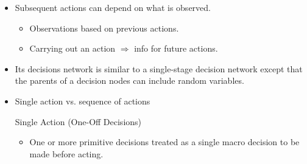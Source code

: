 \documentclass{article}
\begin{document}
\begin{itemize}
    \item Subsequent actions can depend on what is observed.
        \begin{itemize}
            \item Observations based on previous actions.
            \item Carrying out an action $\Rightarrow$ info for future actions.
        \end{itemize}
    \item Its decisions network is similar to a single-stage decision network except that the parents of a decision nodes can include random variables.
    \item Single action vs. sequence of actions
     \begin{multicols}{2}
            Single Action (One-Off Decisions)
            \begin{itemize}
                \item One or more primitive decisions treated as a single macro decision to be made before acting.
            \end{itemize}
            
            \columnbreak
            

\end{multicols}
\end{itemize}
\end{document}

